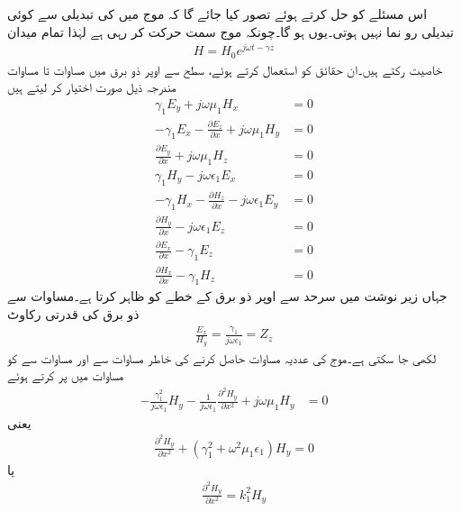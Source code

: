 اس مسئلے کو حل کرتے ہوئے تصور کیا جائے گا کہ موج میں   کی تبدیلی سے کوئی تبدیلی رو نما نہیں ہوتی۔یوں  ہو گا۔چونکہ موج  سمت حرکت کر رہی ہے لہٰذا تمام میدان
\begin{align}\label{مساوات_مویج_حرکت_کرتی_موج_عمومی}
H=H_0 e^{j\omega t -\gamma z}
\end{align}
خاصیت رکتے ہیں۔ان حقائق کو استعمال کرتے ہوئے، سطح سے اوپر ذو برق میں مساوات  تا مساوات  مندرجہ ذیل صورت اختیار کر لیتے ہیں
\begin{align}
\gamma_1  E_y+j\omega \mu_1 H_x&=0 \label{مساوات_مویج_سطح_الف}\\
-\gamma_1  E_x-\frac{\partial E_z}{\partial x}+j\omega\mu_1  H_y&=0 \label{مساوات_مویج_سطح_ب}\\
\frac{\partial E_y}{\partial x}+j\omega\mu_1  H_z&=0 \label{مساوات_مویج_سطح_پ}\\
\gamma_1 H_y-j\omega\epsilon_1  E_x&=0 \label{مساوات_مویج_سطح_ت}\\
-\gamma_1 H_x-\frac{\partial H_z}{\partial x}-j\omega\epsilon_1  E_y&=0 \label{مساوات_مویج_سطح_ٹ}\\
\frac{\partial H_y}{\partial x}-j\omega\epsilon_1 E_z&=0 \label{مساوات_مویج_سطح_ث}\\
\frac{\partial E_x}{\partial x}-\gamma_1  E_z&=0\label{مساوات_مویج_سطح_ج}\\
\frac{\partial H_x}{\partial x}-\gamma_1  H_z&=0 \label{مساوات_مویج_سطح_چ}
\end{align}
جہاں زیر نوشت میں  سرحد سے اوپر ذو برق کے خطے کو ظاہر کرتا ہے۔مساوات  سے ذو برق کی قدرتی رکاوٹ 
\begin{align}\label{مساوات_مویج_ذو_برق_قدرتی_رکاوٹ}
\frac{E_x}{H_y}=\frac{\gamma_1}{j\omega \epsilon_1}=Z_z
\end{align}
لکھی جا سکتی ہے۔موج کی عددیہ مساوات  حاصل کرنے کی خاطر مساوات  سے  اور مساوات  سے  کو مساوات  میں پر کرتے ہوئے
\begin{align*}
-\frac{\gamma_1^2}{j\omega \epsilon_1}  H_y-\frac{1}{j\omega \epsilon_1}\frac{\partial^2 H_y}{\partial x^2}+j\omega\mu_1  H_y&=0
\end{align*}
یعنی
\begin{align*}
\frac{\partial^2 H_y}{\partial x^2}+\left(\gamma_1^2+\omega^2 \mu_1 \epsilon_1 \right) H_y=0
\end{align*}
یا
\begin{align}\label{مساوات_مویج_سطح_ذو_برق_موج}
\frac{\partial^2 H_y}{\partial x^2}= k_1^2H_y
\end{align}
